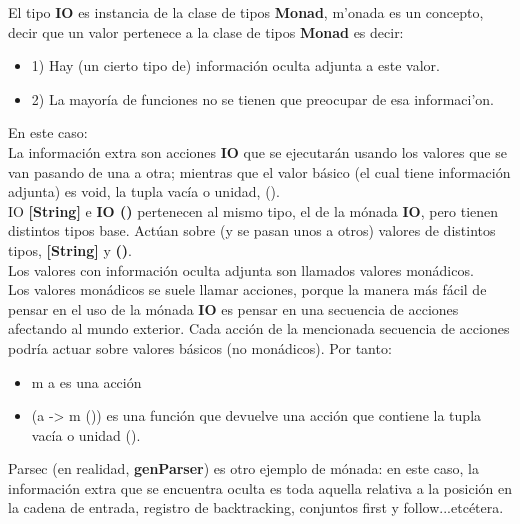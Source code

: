 El tipo \textbf{IO} es instancia de la clase de tipos \textbf{Monad}, m'onada es un concepto, decir que un valor pertenece a la clase de tipos \textbf{\textbf{Monad}} es decir:\\

\begin{itemize}
  \item 1) Hay (un cierto tipo de) informaci\'on oculta adjunta a este valor.
  \item 2) La mayor\'ia de funciones no se tienen que preocupar de esa informaci'on.
\end{itemize}

En este caso:\\

La informaci\'on extra son acciones \textbf{IO} que se ejecutar\'an usando los valores que se van pasando de una a otra; mientras que el valor b\'asico (el cual tiene informaci\'on adjunta) es void, la tupla vac\'ia o unidad, ().\\

IO \textbf{[String]} e \textbf{IO ()} pertenecen al mismo tipo, el de la m\'onada \textbf{IO}, pero tienen distintos tipos base. Act\'uan sobre (y se pasan unos a otros) valores de distintos tipos, \textbf{[String]} y \textbf{()}.\\

Los valores con informaci\'on oculta adjunta son llamados valores mon\'adicos.\\

Los valores mon\'adicos se suele llamar acciones, porque la manera m\'as f\'acil de pensar en el uso de la m\'onada \textbf{IO} es pensar en una secuencia de acciones afectando al mundo exterior. Cada acci\'on de la mencionada secuencia de acciones podr\'ia actuar sobre valores b\'asicos (no mon\'adicos). Por tanto:\\

\begin{itemize}
  \item m a es una acci\'on
  \item (a -> m ()) es una funci\'on que devuelve una acci\'on que contiene la tupla vac\'ia o unidad ().
\end{itemize}

Parsec (en realidad, \textbf{genParser}) es otro ejemplo de m\'onada: en este caso, la informaci\'on extra que se encuentra oculta es toda aquella relativa a la posici\'on en la cadena de entrada, registro de backtracking, conjuntos first y follow...etc\'etera.\\

